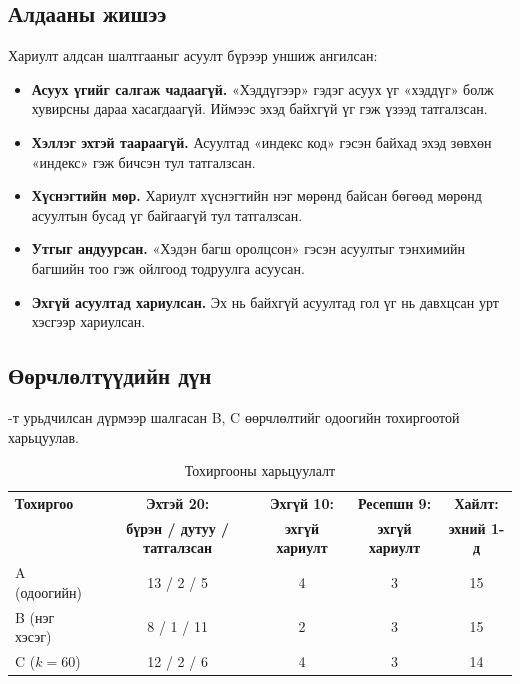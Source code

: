 \subsection{Алдааны жишээ}
\label{sec:res-rag-errors}

Хариулт алдсан шалтгааныг асуулт бүрээр уншиж ангилсан:
\begin{itemize}
    \item \textbf{Асуух үгийг салгаж чадаагүй.} «Хэддүгээр» гэдэг асуух үг «хэддүг» болж хувирсны дараа хасагдаагүй. Иймээс эхэд байхгүй үг гэж үзээд татгалзсан.
    \item \textbf{Хэллэг эхтэй таараагүй.} Асуултад «индекс код» гэсэн байхад эхэд зөвхөн «индекс» гэж бичсэн тул татгалзсан.
    \item \textbf{Хүснэгтийн мөр.} Хариулт хүснэгтийн нэг мөрөнд байсан бөгөөд мөрөнд асуултын бусад үг байгаагүй тул татгалзсан.
    \item \textbf{Утгыг андуурсан.} «Хэдэн багш оролцсон» гэсэн асуултыг тэнхимийн багшийн тоо гэж ойлгоод тодруулга асуусан.
    \item \textbf{Эхгүй асуултад хариулсан.} Эх нь байхгүй асуултад гол үг нь давхцсан урт хэсгээр хариулсан.
\end{itemize}

\subsection{Өөрчлөлтүүдийн дүн}
\label{sec:res-rag-variants}

-т урьдчилсан дүрмээр шалгасан B, C өөрчлөлтийг одоогийн тохиргоотой харьцуулав.

\begin{table}[H]
\centering
\caption{Тохиргооны харьцуулалт}
\label{tab:rag_variants}
\begin{tabular}{|l|c|c|c|c|}
\hline
\textbf{Тохиргоо} & \textbf{Эхтэй 20:} & \textbf{Эхгүй 10:} & \textbf{Ресепшн 9:} & \textbf{Хайлт:} \\
 & \textbf{бүрэн / дутуу / татгалзсан} & \textbf{эхгүй хариулт} & \textbf{эхгүй хариулт} & \textbf{эхний 1-д} \\
\hline
A (одоогийн) & 13 / 2 / 5 & 4 & 3 & 15 \\
B (нэг хэсэг) & 8 / 1 / 11 & 2 & 3 & 15 \\
C ($k=60$) & 12 / 2 / 6 & 4 & 3 & 14 \\
\hline
\end{tabular}
\end{table}

